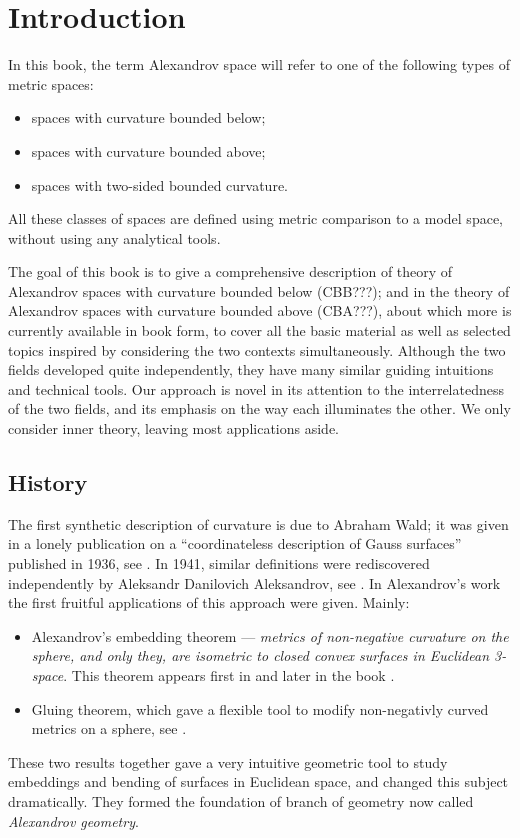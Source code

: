 \chapter*{Introduction}

In this book, the term Alexandrov space will refer to one of the following types of %
metric spaces:
\begin{itemize}
\item spaces with curvature bounded below;
\item spaces with curvature bounded above;
\item spaces with two-sided bounded curvature.
\end{itemize}
All these classes of spaces are defined using metric comparison to a model space, without using any analytical tools. 

The goal of this book is to give a comprehensive description of theory of Alexandrov spaces with curvature bounded below (CBB???);  and in the theory of Alexandrov spaces with curvature bounded above (CBA???), about which more is currently available in book form, to cover all the basic material as well as selected topics inspired by considering the two contexts simultaneously.  
Although the two fields developed quite independently, they have many similar guiding intuitions and technical tools.  Our approach is novel in its attention to the interrelatedness of the two fields, and its emphasis on the way each illuminates the other.  We only consider inner theory, leaving most applications aside.


\section*{History}

The first synthetic description of curvature is due to Abraham Wald; 
it was given in a lonely publication on a ``coordinateless description of Gauss surfaces'' published in 1936, see \cite{wald}.
In 1941, similar definitions were rediscovered independently by Aleksandr Danilovich Aleksandrov,
see \cite{alexandrov:def}.
In Alexandrov's work the first fruitful applications of this approach were given.
Mainly:
\begin{itemize}
\item Alexandrov's embedding theorem  --- 
\textit{metrics of non-negative curvature on the sphere, and only they, are isometric to closed convex surfaces in Euclidean 3-space}. This theorem appears first in \cite{alexandrov:def} and later in the book \cite{alexandrov-embedding}.
\item Gluing theorem, which gave a flexible tool to modify non-negativly curved metrics on a sphere, see \cite{alexandrov-glueing}.
\end{itemize}
These two results together gave  a very intuitive geometric tool to study embeddings and bending of surfaces in Euclidean space, and changed this subject dramatically.
They formed the foundation of branch of geometry now called \emph{Alexandrov geometry}.

